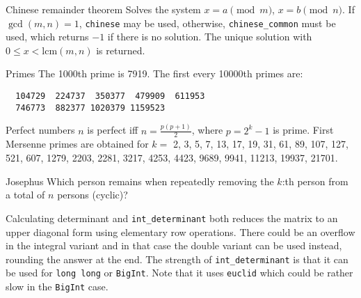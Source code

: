 \clearpage
{}
\categorycontents{}



\begin{algorithm}{Chinese remainder theorem}
\desc
Solves the system $x = a \pmod m$, $x = b \pmod n$.  If $\gcd(m,n) =
1$, {\tt chinese} may be used, otherwise, {\tt chinese\_common} must be
used, which returns $-1$ if there is no solution.  The unique solution
with $0 \le x < \mathrm{lcm}(m, n)$ is returned.
\end{algorithm}

\begin{algorithm}{Primes}
\desc
The 1000th prime is 7919. The first every 10000th primes are: {\small
\begin{verbatim}
  104729  224737  350377  479909  611953
  746773  882377 1020379 1159523
\end{verbatim}
}\end{algorithm}




\begin{algorithm}{Perfect numbers}
\desc
$n$ is perfect iff $n = \frac{p(p+1)}{2}$, where $p = 2^k-1$ is prime.
First Mersenne primes are obtained for $k =$ 2, 3, 5, 7, 13, 17, 19,
31, 61, 89, 107, 127, 521, 607, 1279, 2203, 2281, 3217, 4253, 4423,
9689, 9941, 11213, 19937, 21701.
\end{algorithm}

\begin{algorithm}{Josephus}
\desc
Which person remains when repeatedly removing the $k$:th person from a
total of $n$ persons (cyclic)?
\end{algorithm}



\begin{algorithm}{Calculating determinant}
 and {\tt int\_determinant} both reduces the matrix
to an upper diagonal form using elementary row operations. There could be an
overflow in the integral variant and in that case the double variant
can be used instead, rounding the answer at the end. The strength of
{\tt int\_determinant} is that it can be used for {\tt long long} or
{\tt BigInt}. Note that it uses {\tt euclid} which could be rather
slow in the {\tt BigInt} case.
\end{algorithm}

